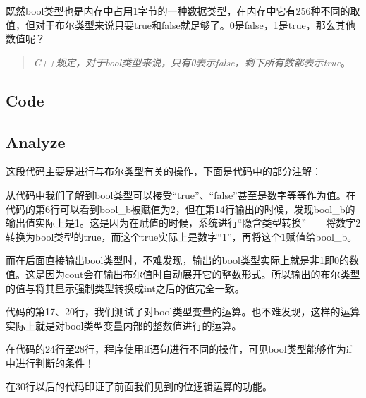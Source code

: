 既然bool类型也是内存中占用1字节的一种数据类型，在内存中它有256种不同的取值，但对于布尔类型来说只要true和false就足够了。0是false，1是true，那么其他数值呢？
\begin{quote}
	\emph{C++规定，对于bool类型来说，只有0表示false，剩下所有数都表示true}。
\end{quote}

\subsection{Code}



\subsection{Analyze}

这段代码主要是进行与布尔类型有关的操作，下面是代码中的部分注解：
\showremarks

从代码中我们了解到bool类型可以接受“true”、“false”甚至是数字等等作为值。在代码的第6行可以看到bool\_b被赋值为2，但在第14行输出的时候，发现bool\_b的输出值实际上是1。这是因为在赋值的时候，系统进行“隐含类型转换”——将数字2转换为bool类型的true，而这个true实际上是数字“1”，再将这个1赋值给bool\_b。

而在后面直接输出bool类型时，不难发现，输出的bool类型实际上就是非1即0的数值。这是因为cout会在输出布尔值时自动展开它的整数形式。所以输出的布尔类型的值与将其显示强制类型转换成int之后的值完全一致。

代码的第17、20行，我们测试了对bool类型变量的运算。也不难发现，这样的运算实际上就是对bool类型变量内部的整数值进行的运算。

在代码的24行至28行，程序使用if语句进行不同的操作，可见bool类型能够作为if中进行判断的条件！

在30行以后的代码印证了前面我们见到的位逻辑运算的功能。

